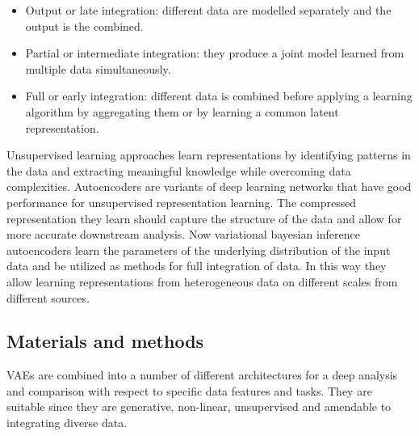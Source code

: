 	\begin{itemize}
		\item Output or late integration: different data are modelled separately and the output is the combined.
		\item Partial or intermediate integration: they produce a joint model learned from multiple data simultaneously.
		\item Full or early integration: different data is combined before applying a learning algorithm by aggregating them or by learning a common latent representation.
	\end{itemize}

	Unsupervised learning approaches learn representations by identifying patterns in the data and extracting meaningful knowledge while overcoming data complexities.
	Autoencoders are variants of deep learning networks that have good performance for unsupervised representation learning.
	The compressed representation they learn should capture the structure of the data and allow for more accurate downstream analysis.
	Now variational bayesian inference autoencoders learn the parameters of the underlying distribution of the input data and be utilized as methods for full integration of data.
	In this way they allow learning representations from heterogeneous data on different scales from different sources.

	\subsection{Materials and methods}
	VAEs are combined into a number of different architectures for a deep analysis and comparison with respect to specific data features and tasks.
	They are suitable since they are generative, non-linear, unsupervised and amendable to integrating diverse data.

